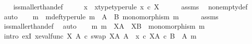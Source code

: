\begin{isabellebody}
%
\isadelimproof
\ \ %
\endisadelimproof
%
\isatagproof
{}\isamarkupfalse%
\ is{\isacharunderscore}{\kern0pt}smaller{\isacharunderscore}{\kern0pt}than{\isacharunderscore}{\kern0pt}def\isanewline
{}\isamarkupfalse%
\ {\isacharminus}{\kern0pt}\isanewline
\ \ \isamarkupfalse%
\ x\ \ x{\isacharunderscore}{\kern0pt}type{\isacharbrackleft}{\kern0pt}type{\isacharunderscore}{\kern0pt}rule{\isacharbrackright}{\kern0pt}{\isacharcolon}{\kern0pt}\ {\isachardoublequoteopen}x\ {\isasymin}\isactrlsub c\ X{\isachardoublequoteclose}\isanewline
\ \ \ \ \isamarkupfalse%
\ assms{\isacharparenleft}{\kern0pt}{}{\isacharparenright}{\kern0pt}\ \isamarkupfalse%
\ nonempty{\isacharunderscore}{\kern0pt}def\ \isamarkupfalse%
\ auto\isanewline
\ \ \isamarkupfalse%
\ m\ \ m{\isacharunderscore}{\kern0pt}def{\isacharbrackleft}{\kern0pt}type{\isacharunderscore}{\kern0pt}rule{\isacharbrackright}{\kern0pt}{\isacharcolon}{\kern0pt}\ {\isachardoublequoteopen}m\ {\isacharcolon}{\kern0pt}\ A\ {\isasymrightarrow}\ B{\isachardoublequoteclose}\ {\isachardoublequoteopen}monomorphism\ m{\isachardoublequoteclose}\isanewline
\ \ \ \ \isamarkupfalse%
\ assms{\isacharparenleft}{\kern0pt}{}{\isacharparenright}{\kern0pt}\ \isamarkupfalse%
\ is{\isacharunderscore}{\kern0pt}smaller{\isacharunderscore}{\kern0pt}than{\isacharunderscore}{\kern0pt}def\ \isamarkupfalse%
\ auto\isanewline
\ \ \isamarkupfalse%
\ {\isachardoublequoteopen}{\isasymexists}m{\isachardot}{\kern0pt}\ m\ {\isacharcolon}{\kern0pt}\ X\isactrlbsup A\isactrlesup \ {\isasymrightarrow}\ X\isactrlbsup B\isactrlesup \ {\isasymand}\ monomorphism\ m{\isachardoublequoteclose}\isanewline
\ \ \isamarkupfalse%
\ {\isacharparenleft}{\kern0pt}intro\ exI{\isacharbrackleft}{\kern0pt}\ x{\isacharequal}{\kern0pt}{\isachardoublequoteopen}{\isacharparenleft}{\kern0pt}{\isacharparenleft}{\kern0pt}{\isacharparenleft}{\kern0pt}eval{\isacharunderscore}{\kern0pt}func\ X\ A\ {\isasymcirc}\isactrlsub c\ swap\ {\isacharparenleft}{\kern0pt}X\isactrlbsup A\isactrlesup {\isacharparenright}{\kern0pt}\ A{\isacharparenright}{\kern0pt}\ {\isasymamalg}\ {\isacharparenleft}{\kern0pt}x\ {\isasymcirc}\isactrlsub c\ {\isasymbeta}\isactrlbsub X\isactrlbsup A\isactrlesup \ {\isasymtimes}\isactrlsub c\ {\isacharparenleft}{\kern0pt}B\ {\isasymsetminus}\ {\isacharparenleft}{\kern0pt}A{\isacharcomma}{\kern0pt}\ m{\isacharparenright}{\kern0pt}{\isacharparenright}{\kern0pt}\isactrlesub {\isacharparenright}{\kern0pt}{\isacharparenright}{\kern0pt}\isanewline

\end{isabellebody}
